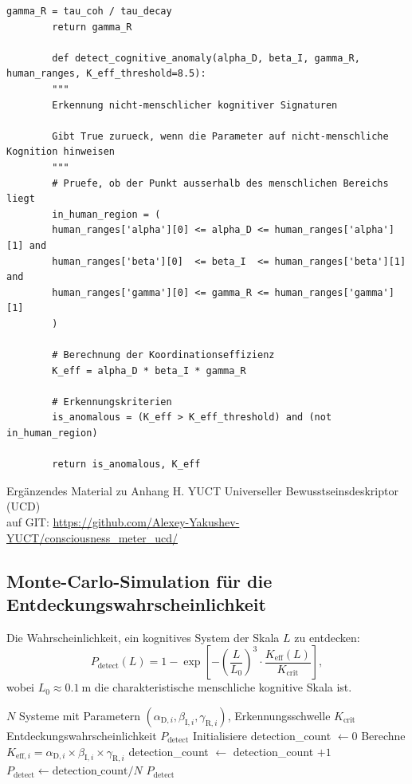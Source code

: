 \documentclass[12pt,a4paper]{article}
\newcommand{\eff}{\mathrm{eff}}
\newcommand{\Ke}{K_{\eff}}
\newcommand{\Kcrit}{K_{\mathrm{crit}}}
\begin{document}
\begin{lstlisting}[caption={Python-Code zur Schätzung von UCD-Parametern aus Zeitreihendaten}, label={lst:ucd-python}]
		gamma_R = tau_coh / tau_decay
		return gamma_R
		
		def detect_cognitive_anomaly(alpha_D, beta_I, gamma_R, human_ranges, K_eff_threshold=8.5):
		"""
		Erkennung nicht-menschlicher kognitiver Signaturen
		
		Gibt True zurueck, wenn die Parameter auf nicht-menschliche Kognition hinweisen
		"""
		# Pruefe, ob der Punkt ausserhalb des menschlichen Bereichs liegt
		in_human_region = (
		human_ranges['alpha'][0] <= alpha_D <= human_ranges['alpha'][1] and
		human_ranges['beta'][0]  <= beta_I  <= human_ranges['beta'][1]  and
		human_ranges['gamma'][0] <= gamma_R <= human_ranges['gamma'][1]
		)
		
		# Berechnung der Koordinationseffizienz
		K_eff = alpha_D * beta_I * gamma_R
		
		# Erkennungskriterien
		is_anomalous = (K_eff > K_eff_threshold) and (not in_human_region)
		
		return is_anomalous, K_eff
	\end{lstlisting}
	
	Ergänzendes Material zu Anhang H. YUCT Universeller Bewusstseinsdeskriptor (UCD) \\ auf GIT: \url{https://github.com/Alexey-Yakushev-YUCT/consciousness_meter_ucd/}
	
	\subsection{Monte-Carlo-Simulation für die Entdeckungswahrscheinlichkeit}
	
	Die Wahrscheinlichkeit, ein kognitives System der Skala \(L\) zu entdecken:
	\[
	P_{\mathrm{detect}}(L) = 1 - \exp\!\left[-\left(\frac{L}{L_0}\right)^3 \cdot \frac{\Ke(L)}{\Kcrit}\right],
	\]
	wobei \(L_0 \approx 0.1~\mathrm{m}\) die charakteristische menschliche kognitive Skala ist.
	
	\begin{algorithm}
		\caption{Monte-Carlo-Simulation der Erkennung kognitiver Systeme}
		\begin{algorithmic}[1]
			\Require \(N\) Systeme mit Parametern \((\alpha_{\mathrm{D},i}, \beta_{\mathrm{I},i}, \gamma_{\mathrm{R},i})\), Erkennungsschwelle \(\Kcrit\)
			\Ensure Entdeckungswahrscheinlichkeit \(P_{\mathrm{detect}}\)
			\State Initialisiere detection\_count \(\gets 0\)
			\State Berechne \(K_{\eff,i} = \alpha_{\mathrm{D},i} \times \beta_{\mathrm{I},i} \times \gamma_{\mathrm{R},i}\)
			\If{\(K_{\eff,i} > \Kcrit\)}
			\State detection\_count \(\gets\) detection\_count \(+ 1\)
			\EndIf
			\EndFor
			\State \(P_{\mathrm{detect}} \gets \text{detection\_count} / N\)
			\Return \(P_{\mathrm{detect}}\)
		\end{algorithmic}
	\end{algorithm}
	
\end{document}
